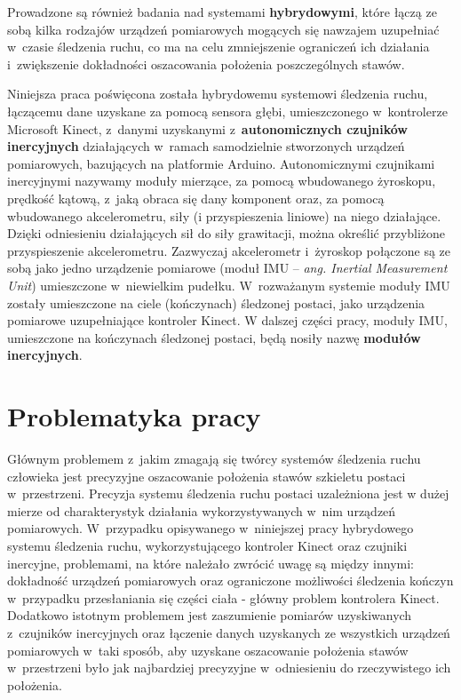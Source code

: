 Prowadzone są również badania nad systemami \textbf{hybrydowymi}, które łączą ze sobą kilka rodzajów urządzeń pomiarowych mogących się nawzajem uzupełniać w~czasie śledzenia ruchu, co ma na celu zmniejszenie ograniczeń ich działania i~zwiększenie dokładności oszacowania położenia poszczególnych stawów.

Niniejsza praca poświęcona została hybrydowemu systemowi śledzenia ruchu, łączącemu dane uzyskane za pomocą sensora głębi, umieszczonego w~kontrolerze Microsoft Kinect, z~danymi uzyskanymi z~\textbf{autonomicznych czujników inercyjnych} działających w~ramach samodzielnie stworzonych urządzeń pomiarowych, bazujących na platformie Arduino. Autonomicznymi czujnikami inercyjnymi nazywamy moduły mierzące, za pomocą wbudowanego żyroskopu, prędkość kątową, z~jaką obraca się dany komponent oraz, za pomocą wbudowanego akcelerometru, siły (i przyspieszenia liniowe) na niego działające. Dzięki odniesieniu działających sił do siły grawitacji, można określić przybliżone przyspieszenie akcelerometru. Zazwyczaj akcelerometr i~żyroskop połączone są ze sobą jako jedno urządzenie pomiarowe (moduł IMU -- \emph{ang. Inertial Measurement Unit}) umieszczone w~niewielkim pudełku. W~rozważanym systemie moduły IMU zostały umieszczone na ciele (kończynach) śledzonej postaci, jako urządzenia pomiarowe uzupełniające kontroler Kinect. W dalszej części pracy, moduły IMU, umieszczone na kończynach śledzonej postaci, będą nosiły nazwę \textbf{modułów inercyjnych}.

\section{Problematyka pracy}
Głównym problemem z~jakim zmagają się twórcy systemów śledzenia ruchu człowieka jest precyzyjne oszacowanie położenia stawów szkieletu postaci w~przestrzeni. Precyzja systemu śledzenia ruchu postaci uzależniona jest w dużej mierze od charakterystyk działania wykorzystywanych w~nim urządzeń pomiarowych. W~przypadku opisywanego w~niniejszej pracy hybrydowego systemu śledzenia ruchu, wykorzystującego kontroler Kinect oraz czujniki inercyjne, problemami, na które należało zwrócić uwagę są między innymi: dokładność urządzeń pomiarowych oraz ograniczone możliwości śledzenia kończyn w~przypadku przesłaniania się części ciała - główny problem kontrolera Kinect. Dodatkowo istotnym problemem jest zaszumienie pomiarów uzyskiwanych z~czujników inercyjnych oraz łączenie danych uzyskanych ze wszystkich urządzeń pomiarowych w~taki sposób, aby uzyskane oszacowanie położenia stawów w~przestrzeni było jak najbardziej precyzyjne w~odniesieniu do rzeczywistego ich położenia.\\

